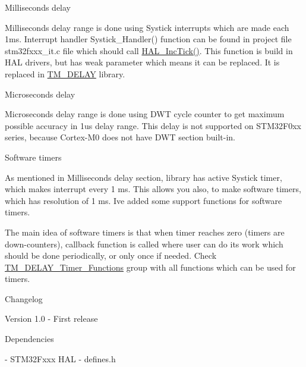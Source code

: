 \begin{DoxyParagraph}{Milliseconds delay}

\end{DoxyParagraph}
Milliseconds delay range is done using Systick interrupts which are made each 1ms. Interrupt handler Systick\+\_\+\+Handler() function can be found in project file stm32fxxx\+\_\+it.\+c file which should call \hyperlink{tm__stm32__delay_8c_aa8361d44d76b7f6256834f828165837a}{H\+A\+L\+\_\+\+Inc\+Tick()}. This function is build in H\+AL drivers, but has {\ttfamily weak} parameter which means it can be replaced. It is replaced in \hyperlink{group___t_m___d_e_l_a_y}{T\+M\+\_\+\+D\+E\+L\+AY} library.

\begin{DoxyParagraph}{Microseconds delay}

\end{DoxyParagraph}
Microseconds delay range is done using D\+WT cycle counter to get maximum possible accuracy in 1us delay range. This delay is not supported on S\+T\+M32\+F0xx series, because Cortex-\/\+M0 does not have D\+WT section built-\/in.

\begin{DoxyParagraph}{Software timers}

\end{DoxyParagraph}
As mentioned in Milliseconds delay section, library has active Systick timer, which makes interrupt every 1 ms. This allows you also, to make software timers, which has resolution of 1 ms. I\textquotesingle{}ve added some support functions for software timers.

The main idea of software timers is that when timer reaches zero (timers are down-\/counters), callback function is called where user can do its work which should be done periodically, or only once if needed. Check \hyperlink{group___t_m___d_e_l_a_y___timer___functions}{T\+M\+\_\+\+D\+E\+L\+A\+Y\+\_\+\+Timer\+\_\+\+Functions} group with all functions which can be used for timers.

\begin{DoxyParagraph}{Changelog}

\end{DoxyParagraph}
\begin{DoxyVerb} Version 1.0
  - First release
\end{DoxyVerb}


\begin{DoxyParagraph}{Dependencies}

\end{DoxyParagraph}
\begin{DoxyVerb} - STM32Fxxx HAL
 - defines.h
\end{DoxyVerb}
 